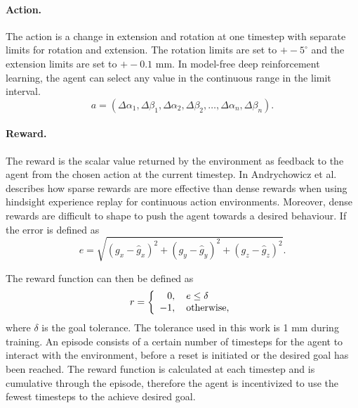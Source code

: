 \paragraph{Action.} The action is a change in extension and rotation at one timestep with separate limits for rotation and extension. The rotation limits are set to $+- 5^\circ$ and the extension limits are set to $+- 0.1$ mm. In model-free deep reinforcement learning, the agent can select any value in the continuous range in the limit interval.
\begin{equation}
a = \left( \Delta \alpha_1, \Delta \beta_1, \Delta \alpha_2, \Delta \beta_2,  \dots, \Delta \alpha_n, \Delta \beta_n \right). \label{eqn:action-definition}
\end{equation}

\paragraph{Reward.} The reward is the scalar value returned by the environment as feedback to the agent from the chosen action at the current timestep. In \cite{andrychowicz2017hindsight} Andrychowicz et al. describes how sparse rewards are more effective than dense rewards when using hindsight experience replay for continuous action environments. Moreover, dense rewards are difficult to shape to push the agent towards a desired behaviour. If the error is defined as
\begin{equation}
e = \sqrt{(g_x - \hat{g}_x)^2 + (g_y - \hat{g}_y)^2 + (g_z - \hat{g}_z)^2}. \label{eqn:error}
\end{equation}

The reward function can then be defined as
\begin{equation}
r =
  \left\{
    \begin{array}{l}
      \hphantom{-}0, \quad e \leq \delta \\
      -1, \quad \textnormal{otherwise},
    \end{array}
  \right. \label{eqn:reward}
\end{equation}
where $\delta$ is the goal tolerance. The tolerance used in this work is 1 mm during training. An episode consists of a certain number of timesteps for the agent to interact with the environment, before a reset is initiated or the desired goal has been reached. The reward function is calculated at each timestep and is cumulative through the episode, therefore the agent is incentivized to use the fewest timesteps to the achieve desired goal.

